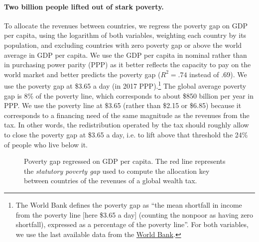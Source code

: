\documentclass[12pt,english]{article}
\begin{document}
\paragraph{Two billion people lifted out of stark poverty.} To allocate the revenues between countries, we regress the poverty gap on GDP per capita, using the logarithm of both variables, weighting each country by its population, and excluding countries with zero poverty gap or above the world average in GDP per capita. We use the GDP per capita in nominal  rather than in purchasing power parity (PPP) as it better reflects the capacity to pay on the world market and better predicts the poverty gap ($R^2 = .74$ instead of .69). %
We use the poverty gap at \$3.65 a day (in 2017 PPP).\footnote{The World Bank defines the poverty gap as ``the mean shortfall in income from the poverty line [here \$3.65 a day] (counting the nonpoor as having zero shortfall), expressed as a percentage of the poverty line''. For both variables, we use the last available data from the \href{https://data.worldbank.org/indicator/SI.POV.LMIC.GP}{World Bank}.} The global average poverty gap is 8\% of the poverty line, which corresponds to about \$850 billion per year in PPP. We use the poverty line at \$3.65 (rather than \$2.15 or \$6.85) because it corresponds to a financing need of the same magnitude as the revenues from the tax. In other words, the redistribution operated by the tax should roughly allow to close the poverty gap at \$3.65 a day, i.e. to lift above that threshold the 24\% of people who live below it. 

\begin{figure}[b!]
  \caption{Poverty gap regressed on GDP per capita. The red line represents the \textit{statutory poverty gap} used to compute the allocation key between countries of the revenues of a global wealth tax. }\label{fig:gap_GDP}
\end{figure}
\end{document}
